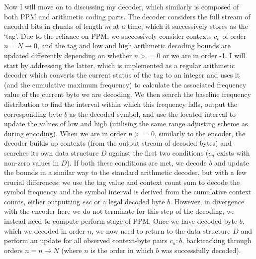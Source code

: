 \documentclass[a4paper, 11pt]{article}
\begin{document}
Now I will move on to discussing my decoder, which similarly is composed of both PPM and arithmetic coding parts. The decoder considers the full stream of encoded bits in chunks of length $m$ at a time, which it successively stores as the ‘tag’. Due to the reliance on PPM, we successively consider contexts $c_{n}$ of order $n = N \to 0$, and the tag and low and high arithmetic decoding bounds are updated differently depending on whether $n >= 0$ or we are in order -1. I will start by addressing the latter, which is implemented as a regular arithmetic decoder which converts the current status of the tag to an integer and uses it (and the cumulative maximum frequency) to calculate the associated frequency value of the current byte we are decoding. We then search the baseline frequency distribution to find the interval within which this frequency falls, output the corresponding byte $b$ as the decoded symbol, and use the located interval to update the values of low and high (utilising the same range adjusting scheme as during encoding). When we are in order $n >= 0$, similarly to the encoder, the decoder builds up contexts (from the output stream of decoded bytes) and searches its own data structure $D$ against the first two conditions ($c_{n}$ exists with non-zero values in $D$). If both these conditions are met, we decode $b$ and update the bounds in a similar way to the standard arithmetic decoder, but with a few crucial differences: we use the tag value and context count sum to decode the symbol frequency and the symbol interval is derived from the cumulative context counts, either outputting $esc$ or a legal decoded byte $b$. However, in divergence with the encoder here we do not terminate for this step of the decoding, we instead need to compute perform stage of PPM. Once we have decoded byte $b$, which we decoded in order $n$, we now need to return to the data structure $D$ and perform an update for all observed context-byte pairs $c_{n} \colon b$, backtracking through orders $n = n \to N$ (where $n$ is the order in which $b$ was successfully decoded).
\end{document}
